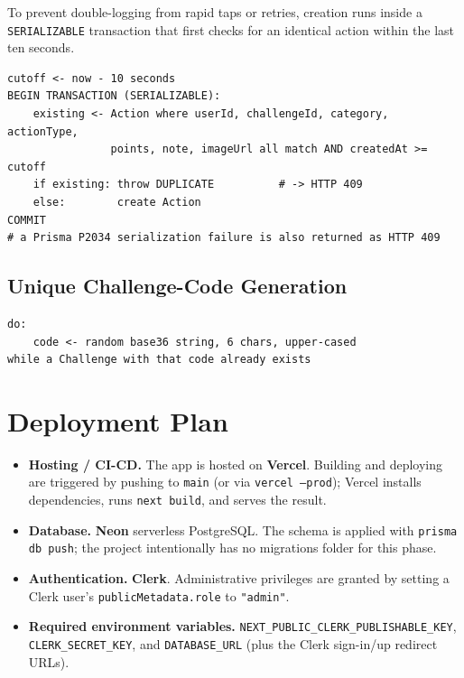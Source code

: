 \documentclass[11pt]{article}
\begin{document}
To prevent double-logging from rapid taps or retries, creation runs inside a
\texttt{SERIALIZABLE} transaction that first checks for an identical action
within the last ten seconds.

\begin{verbatim}
cutoff <- now - 10 seconds
BEGIN TRANSACTION (SERIALIZABLE):
    existing <- Action where userId, challengeId, category, actionType,
                points, note, imageUrl all match AND createdAt >= cutoff
    if existing: throw DUPLICATE          # -> HTTP 409
    else:        create Action
COMMIT
# a Prisma P2034 serialization failure is also returned as HTTP 409
\end{verbatim}

\subsection{Unique Challenge-Code Generation}

\begin{verbatim}
do:
    code <- random base36 string, 6 chars, upper-cased
while a Challenge with that code already exists
\end{verbatim}

\section{Deployment Plan}

\begin{itemize}
    \item \textbf{Hosting / CI-CD.} The app is hosted on \textbf{Vercel}.
    Building and deploying are triggered by pushing to \texttt{main} (or via
    \texttt{vercel --prod}); Vercel installs dependencies, runs
    \texttt{next build}, and serves the result.
    \item \textbf{Database.} \textbf{Neon} serverless PostgreSQL. The schema is
    applied with \texttt{prisma db push}; the project intentionally has no
    migrations folder for this phase.
    \item \textbf{Authentication.} \textbf{Clerk}. Administrative privileges
    are granted by setting a Clerk user's \texttt{publicMetadata.role} to
    \texttt{"admin"}.
    \item \textbf{Required environment variables.}
    \texttt{NEXT\_PUBLIC\_CLERK\_PUBLISHABLE\_KEY},
    \texttt{CLERK\_SECRET\_KEY}, and \texttt{DATABASE\_URL} (plus the Clerk
    sign-in/up redirect URLs).
\end{itemize}
\end{document}
